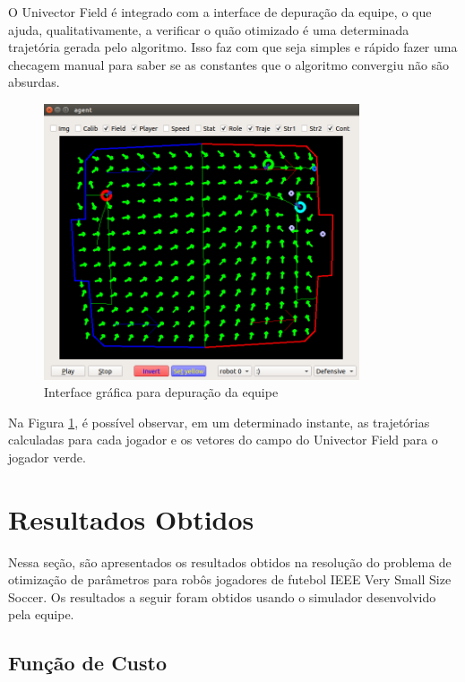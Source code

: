 \documentclass[a4paper,12pt]{article}
\begin{document}
O Univector Field é integrado com a interface de depuração da equipe, o que ajuda, qualitativamente, a verificar o quão otimizado é uma determinada trajetória gerada pelo algoritmo. Isso faz com que seja simples e rápido fazer uma checagem manual para saber se as constantes que o algoritmo convergiu não são absurdas.

\begin{figure}[H]
	\centering
	\includegraphics[width=0.83\textwidth]{figures/UnivectorFieldSimulatorDebugger.png}
	\caption{Interface gráfica para depuração da equipe}
	\label{fig:univector}
\end{figure}

Na Figura \ref{fig:univector}, é possível observar, em um determinado instante, as trajetórias calculadas para cada jogador e os vetores do campo do Univector Field para o jogador verde.


\section{Resultados Obtidos}
	\label{secao: resultados_obtidos}
    
Nessa seção, são apresentados os resultados obtidos na resolução do problema de otimização de parâmetros para robôs jogadores de futebol IEEE Very Small Size Soccer. Os resultados a seguir foram obtidos usando o simulador desenvolvido pela equipe.

\subsection{Função de Custo}
\end{document}
